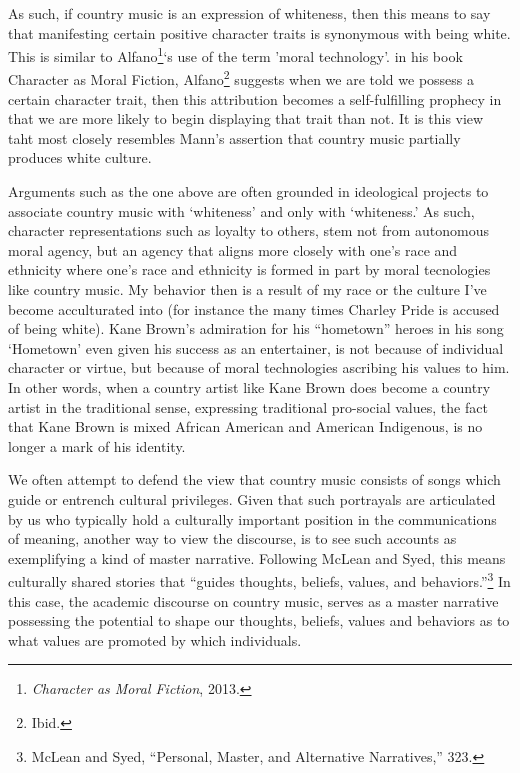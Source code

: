 \documentclass[phdthesis,12pt,final,a4paper]{wuthesis}
\theoremstyle{definition}
\theoremstyle{definition}
\theoremstyle{definition}
\theoremstyle{definition}
\theoremstyle{remark}
\begin{document}
As such, if country music is an expression of whiteness, then this means to say that manifesting certain positive character traits is synonymous with being white. This is similar to Alfano\footnote{\emph{Character as Moral Fiction}, 2013.}`s use of the term 'moral technology'. in his book Character as Moral Fiction, Alfano\footnote{Ibid.} suggests when we are told we possess a certain character trait, then this attribution becomes a self-fulfilling prophecy in that we are more likely to begin displaying that trait than not. It is this view taht most closely resembles Mann's assertion that country music partially produces white culture.

Arguments such as the one above are often grounded in ideological projects to associate country music with `whiteness' and only with `whiteness.' As such, character representations such as loyalty to others, stem not from autonomous moral agency, but an agency that aligns more closely with one's race and ethnicity where one's race and ethnicity is formed in part by moral tecnologies like country music. My behavior then is a result of my race or the culture I've become acculturated into (for instance the many times Charley Pride is accused of being white). Kane Brown's admiration for his ``hometown'' heroes in his song `Hometown' even given his success as an entertainer, is not because of individual character or virtue, but because of moral technologies ascribing his values to him. In other words, when a country artist like Kane Brown does become a country artist in the traditional sense, expressing traditional pro-social values, the fact that Kane Brown is mixed African American and American Indigenous, is no longer a mark of his identity.

We often attempt to defend the view that country music consists of songs which guide or entrench cultural privileges. Given that such portrayals are articulated by us who typically hold a culturally important position in the communications of meaning, another way to view the discourse, is to see such accounts as exemplifying a kind of master narrative. Following McLean and Syed, this means culturally shared stories that ``guides thoughts, beliefs, values, and behaviors.''\footnote{McLean and Syed, {``Personal, {Master}, and {Alternative Narratives},''} 323.} In this case, the academic discourse on country music, serves as a master narrative possessing the potential to shape our thoughts, beliefs, values and behaviors as to what values are promoted by which individuals.
\end{document}
